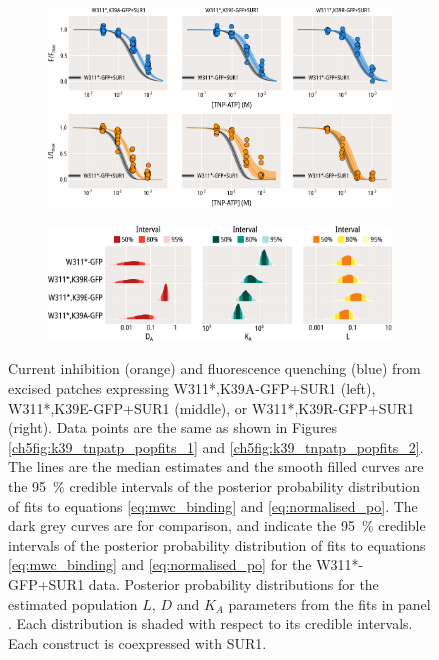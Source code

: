 \begin{figure}[hbtp]
	\centering
	\begin{subfigure}[t]{0.9\textwidth}
		\caption{}\label{ch5fig:mwc_k39_1}
		\centering
		\includegraphics[width=\textwidth]{mwc_k39_1.pdf}
	\end{subfigure}
	\vfill
	\begin{subfigure}[t]{0.9\textwidth}
		\caption{}\label{ch5fig:mwc_k39_2}
		\centering
		\includegraphics[width=\textwidth]{mwc_k39_2.pdf}
	\end{subfigure}
	\caption[K39 mutations affect gating and nucleotide binding]{
	 Current inhibition (orange) and fluorescence quenching (blue) from excised patches expressing W311*,K39A-GFP+SUR1 (left), W311*,K39E-GFP+SUR1 (middle), or W311*,K39R-GFP+SUR1 (right).
	Data points are the same as shown in Figures \ref{ch5fig:k39_tnpatp_popfits_1} and \ref{ch5fig:k39_tnpatp_popfits_2}.
	The lines are the median estimates and the smooth filled curves are the \SI{95}{\percent} credible intervals of the posterior probability distribution of fits to equations \ref{eq:mwc_binding} and \ref{eq:normalised_po}.
	The dark grey curves are for comparison, and indicate the \SI{95}{\percent} credible intervals of the posterior probability distribution of fits to equations \ref{eq:mwc_binding} and \ref{eq:normalised_po} for the W311*-GFP+SUR1 data.
	 Posterior probability distributions for the estimated population $L$, $D$ and $K_A$ parameters from the fits in panel .
	Each distribution is shaded with respect to its credible intervals.
	Each construct is coexpressed with SUR1.
	}\label{ch5fig:k39_2}
\end{figure}

